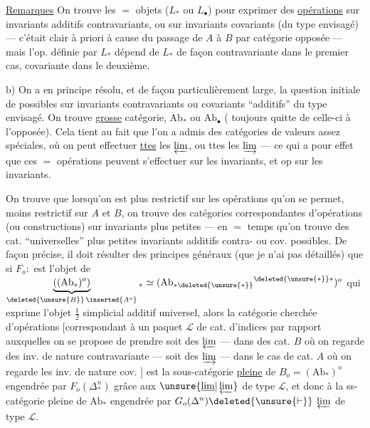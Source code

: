 \uline{Remarques}  On trouve 
les $=$ objets ($L_*$ ou $L_\bullet$) pour exprimer
des \uline{opérations} sur invariants additifs
contravariants, ou sur invariants  covariants
(du type envisagé) --- c'était
clair à priori à cause du passage
de $A$ à $B$ par  catégorie opposée
--- mais l'op. définie par $L_*$ dépend
de $L_*$ de façon contravariante dans le
premier cas, covariante dans le deuxième.

b) On a en principe résolu, et de façon
particulièrement large, la question initiale
de  possibles sur
invariants contravariants ou covariants
``additifs'' du type envisagé. On trouve 
\inserted{$\unsure{=}$} \uline{grosse} catégorie, $\mathrm{Ab}_*$ ou $\mathrm{Ab}_\bullet$ (
toujours quitte de celle-ci à l'opposée). Cela
tient au fait que l'on a admis
des catégories  de valeurs  assez spéciales,
 où on peut effectuer \uline{ttes}
les $\varprojlim$, ou ttes les $\varinjlim$ --- ce
qui a pour effet que ces $=$ opérations
peuvent s'effectuer sur les 
invariants, et op sur les invariants.

On trouve que lorsqu'on est plus
restrictif sur les opérations qu'on
se permet,  moins restrictif
sur $A$ et $B$, on trouve des catégories
correspondantes d'opérations (ou constructions)
sur invariants plus petites --- 
en $=$ temps qu'on trouve des cat.
``universelles'' plus petites 
invariants additifs contra- ou cov.
possibles. \unsure{\&} De façon précise, il doit
résulter des principes généraux (que je
n'ai pas détaillés) que si  $F_o:$ \deleted{$\unsure{\widehat{\boldsymbol\Delta}}$}
est l'objet de
$\underbrace{((\mathrm{Ab}_*)^o)}_{\deleted{\unsure{B}}\,\inserted{A^o}}{}_*
\simeq({\mathrm{Ab}_{*\deleted{\unsure{*}}}}^{\deleted{\unsure{*}}*})^o$
qui exprime l'objet $\frac12$ simplicial
additif universel, alors la  catégorie
cherchée d'opérations [correspondant à
un paquet $\mathcal L$ de cat. d'indices par
rapport auxquelles on se propose de
prendre soit des $\varprojlim$ --- dans des cat.
$B$ où on regarde des inv. de nature
contravariante --- soit des $\varinjlim$ --- dans
le cas de cat. $A$ où on regarde les inv. de
nature cov. ] est la sous-catégorie \uline{pleine}
de $B_o=(\mathrm{Ab}_*)^o$ engendrée par $F_o(\Delta_*^n)$ grâce
aux $\unsure{\underline{\lim}|\varprojlim}$ de type $\mathcal L$, et 
donc à la ss-catégorie pleine de $\mathrm{Ab}_*$
engendrée par  $G_o(\Delta^n)\deleted{\unsure{\vdash}}$  $\varprojlim$ de type $\mathcal L$.
